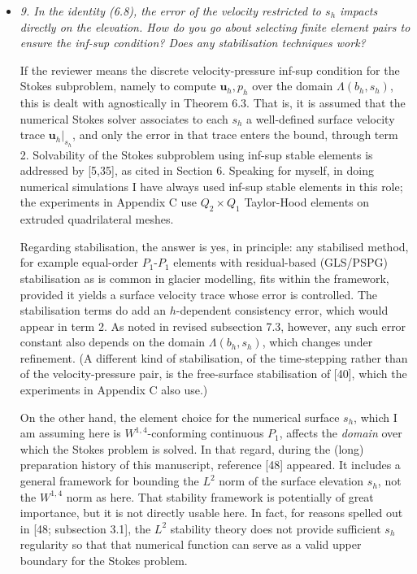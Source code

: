 \documentclass[11pt,reqno]{amsart}
\newcommand{\bu}{\mathbf{u}}
\newcommand{\reply}[2]{%
\medskip
\item \emph{#1}

\medskip
\noindent #2
}
\begin{document}
\begin{itemize}[itemindent=0mm, labelsep=5mm]
\reply{9. In the identity (6.8), the error of the velocity restricted to $s_h$ impacts directly on the elevation.  How do you go about selecting finite element pairs to ensure the inf-sup condition? Does any stabilisation techniques work?}
{If the reviewer means the discrete velocity-pressure inf-sup condition for the Stokes subproblem, namely to compute $\bu_h,p_h$ over the domain $\Lambda(b_h,s_h)$, this is dealt with agnostically in Theorem 6.3.  That is, it is assumed that the numerical Stokes solver associates to each $s_h$ a well-defined surface velocity trace $\bu_h|_{s_h}$, and only the error in that trace enters the bound, through term 2.  Solvability of the Stokes subproblem using inf-sup stable elements is addressed by [5,35], as cited in Section 6.  Speaking for myself, in doing numerical simulations I have always used inf-sup stable elements in this role; the experiments in Appendix C use $Q_2\times Q_1$ Taylor-Hood elements on extruded quadrilateral meshes. \par
Regarding stabilisation, the answer is yes, in principle: any stabilised method, for example equal-order $P_1$-$P_1$ elements with residual-based (GLS/PSPG) stabilisation as is common in glacier modelling, fits within the framework, provided it yields a surface velocity trace whose error is controlled.  The stabilisation terms do add an $h$-dependent consistency error, which would appear in term 2.  As noted in revised subsection 7.3, however, any such error constant also depends on the domain $\Lambda(b_h,s_h)$, which changes under refinement.  (A different kind of stabilisation, of the time-stepping rather than of the velocity-pressure pair, is the free-surface stabilisation of [40], which the experiments in Appendix C also use.) \par
On the other hand, the element choice for the numerical surface $s_h$, which I am assuming here is $W^{1,4}$-conforming continuous $P_1$, affects the \emph{domain} over which the Stokes problem is solved.  In that regard, during the (long) preparation history of this manuscript, reference [48] appeared.  It includes a general framework for bounding the $L^2$ norm of the surface elevation $s_h$, not the $W^{1,4}$ norm as here.  That stability framework is potentially of great importance, but it is not directly usable here.  In fact, for reasons spelled out in [48; subsection 3.1], the $L^2$ stability theory does not provide sufficient $s_h$ regularity so that that numerical function can serve as a valid upper boundary for the Stokes problem.}


\end{itemize}
\end{document}
